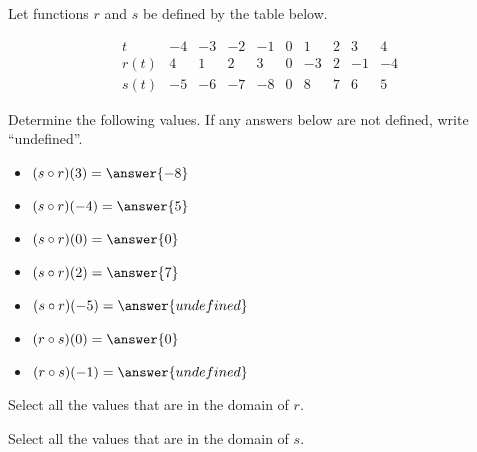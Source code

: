 \documentclass{ximera}
\author{Elizabeth Miller}
\begin{document}
\licenseAPC


Let functions $r$ and $s$ be defined by the table below.

$$
\begin{array}{rrrrrrrrrr}
t&-4&-3&-2&-1&0&1&2&3&4\\
\hline
r(t)&4&1&2&3&0&-3&2&-1&-4\\
\hline
s(t)&-5&-6&-7&-8&0&8&7&6&5
\end{array}
$$

\begin{exercise}
Determine the following values. If any answers below are not defined, write ``undefined''. 
\begin{itemize}
\item $(s \circ r)(3)=\answer{-8}$
\item $(s \circ r)(-4)=\answer{5}$
\item $(s \circ r)(0)=\answer{0}$ 
\item $(s \circ r)(2) = \answer{7}$
\item $(s \circ r)(-5) = \answer{undefined}$
\item $(r \circ s)(0) = \answer{0}$
\item $(r \circ s)(-1) = \answer{undefined}$
\end{itemize}
\end{exercise}

\begin{exercise}
Select all the values that are in the domain of $r$.
  \begin{selectAll}  
  \end{selectAll}  
\end{exercise}

\begin{exercise}
Select all the values that are in the domain of $s$.
  \begin{selectAll}  
  \end{selectAll}  
\end{exercise}
\end{document}
